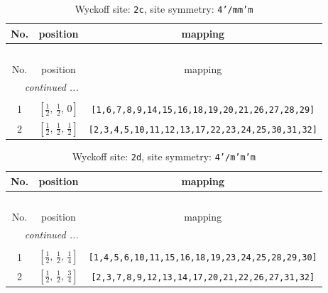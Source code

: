 \documentclass[fleqn,8pt]{jsarticle}
\begin{document}
\renewcommand{\arraystretch}{1.2}
\begin{longtable}{ccc}
\caption{Wyckoff site: {\tt 2c}, site symmetry: {\tt 4'/mm'm}}
 \\
 \hline \hline
No. & position & mapping \\ \hline \endfirsthead

\multicolumn{2}{l}{\tablename\ \thetable{}} \\
 \hline \hline
No. & position & mapping \\ \hline \endhead

 \hline \hline
\multicolumn{2}{r}{\footnotesize\it continued ...} \\ \endfoot

 \hline \hline
\multicolumn{2}{r}{} \\ \endlastfoot

1 & $\left[ \frac{1}{2},\, \frac{1}{2},\, 0 \right]$ & {\tt [1,6,7,8,9,14,15,16,18,19,20,21,26,27,28,29]} \\ \hline
2 & $\left[ \frac{1}{2},\, \frac{1}{2},\, \frac{1}{2} \right]$ & {\tt [2,3,4,5,10,11,12,13,17,22,23,24,25,30,31,32]} \\
\end{longtable}
\renewcommand{\arraystretch}{1.2}
\begin{longtable}{ccc}
\caption{Wyckoff site: {\tt 2d}, site symmetry: {\tt 4'/m'm'm}}
 \\
 \hline \hline
No. & position & mapping \\ \hline \endfirsthead

\multicolumn{2}{l}{\tablename\ \thetable{}} \\
 \hline \hline
No. & position & mapping \\ \hline \endhead

 \hline \hline
\multicolumn{2}{r}{\footnotesize\it continued ...} \\ \endfoot

 \hline \hline
\multicolumn{2}{r}{} \\ \endlastfoot

1 & $\left[ \frac{1}{2},\, \frac{1}{2},\, \frac{1}{4} \right]$ & {\tt [1,4,5,6,10,11,15,16,18,19,23,24,25,28,29,30]} \\ \hline
2 & $\left[ \frac{1}{2},\, \frac{1}{2},\, \frac{3}{4} \right]$ & {\tt [2,3,7,8,9,12,13,14,17,20,21,22,26,27,31,32]} \\
\end{longtable}
\renewcommand{\arraystretch}{1.2}
\end{document}
